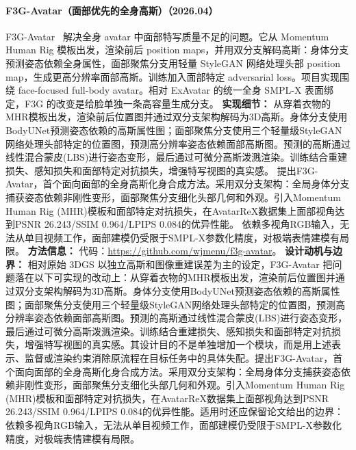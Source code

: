 \paragraph{F3G-Avatar（面部优先的全身高斯）（2026.04）}
F3G-Avatar~\cite{2604_09835} 解决全身 avatar 中面部特写质量不足的问题。它从 Momentum Human Rig 模板出发，渲染前后 position maps，并用双分支解码高斯：身体分支预测姿态依赖全身属性，面部聚焦分支用轻量 StyleGAN 网络处理头部 position map，生成更高分辨率面部高斯。训练加入面部特定 adversarial loss。项目实现围绕 face-focused full-body avatar。相对 ExAvatar 的统一全身 SMPL-X 表面绑定，F3G 的改变是给脸单独一条高容量生成分支。
\textbf{实现细节：} 从穿着衣物的MHR模板出发，渲染前后位置图并通过双分支架构解码为3D高斯。身体分支使用BodyUNet预测姿态依赖的高斯属性图；面部聚焦分支使用三个轻量级StyleGAN网络处理头部特定的位置图，预测高分辨率姿态依赖面部高斯图。预测的高斯通过线性混合蒙皮(LBS)进行姿态变形，最后通过可微分高斯泼溅渲染。训练结合重建损失、感知损失和面部特定对抗损失，增强特写视图的真实感。 提出F3G-Avatar，首个面向面部的全身高斯化身合成方法。采用双分支架构：全局身体分支捕获姿态依赖非刚性变形，面部聚焦分支细化头部几何和外观。引入Momentum Human Rig (MHR)模板和面部特定对抗损失，在AvatarReX数据集上面部视角达到PSNR 26.243/SSIM 0.964/LPIPS 0.084的优异性能。 依赖多视角RGB输入，无法从单目视频工作，面部建模仍受限于SMPL-X参数化精度，对极端表情建模有局限。
\textbf{方法信息：} 代码：\url{https://github.com/wjmenu/f3g-avatar}。
\textbf{设计动机与边界：} 相对原始 3DGS 以独立高斯和图像重建误差为主的设定，F3G-Avatar 把问题落在以下可实现的改动上：从穿着衣物的MHR模板出发，渲染前后位置图并通过双分支架构解码为3D高斯。身体分支使用BodyUNet预测姿态依赖的高斯属性图；面部聚焦分支使用三个轻量级StyleGAN网络处理头部特定的位置图，预测高分辨率姿态依赖面部高斯图。预测的高斯通过线性混合蒙皮(LBS)进行姿态变形，最后通过可微分高斯泼溅渲染。训练结合重建损失、感知损失和面部特定对抗损失，增强特写视图的真实感。其设计目的不是单独增加一个模块，而是用上述表示、监督或渲染约束消除原流程在目标任务中的具体失配。提出F3G-Avatar，首个面向面部的全身高斯化身合成方法。采用双分支架构：全局身体分支捕获姿态依赖非刚性变形，面部聚焦分支细化头部几何和外观。引入Momentum Human Rig (MHR)模板和面部特定对抗损失，在AvatarReX数据集上面部视角达到PSNR 26.243/SSIM 0.964/LPIPS 0.084的优异性能。适用时还应保留论文给出的边界：依赖多视角RGB输入，无法从单目视频工作，面部建模仍受限于SMPL-X参数化精度，对极端表情建模有局限。

